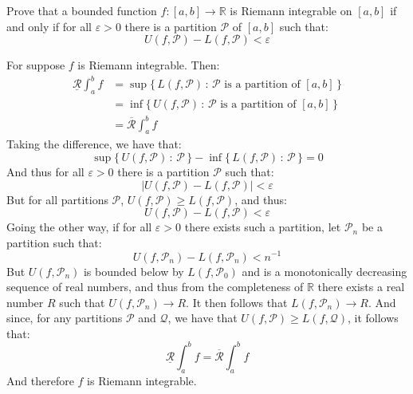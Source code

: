 \documentclass[crop=false,class=article]{standalone}                           %
\begin{document}
    \begin{problem}
        Prove that a bounded function $f:[a,b]\rightarrow\mathbb{R}$ is
        Riemann integrable on $[a,b]$ if and only if for all $\varepsilon>0$
        there is a partition $\mathcal{P}$ of $[a,b]$ such that:
        \begin{equation}
            U(f,\mathcal{P})-L(f,\mathcal{P})<\varepsilon
        \end{equation}
    \end{problem}
    \begin{solution}
        For suppose $f$ is Riemann integrable. Then:
        \begin{subequations}
            \begin{align}
                \underline{\mathcal{R}}\int_{a}^{b}f
                &=\sup\Big\{\,L(f,\mathcal{P})\,:\,
                    \mathcal{P}\textrm{ is a partition of }[a,b]\,\Big\}\\
                &=\inf\Big\{\,U(f,\mathcal{P})\,:\,
                    \mathcal{P}\textrm{ is a partition of }[a,b]\,\Big\}\\
                &=\overline{\mathcal{R}}\int_{a}^{b}f
            \end{align}
        \end{subequations}
        Taking the difference, we have that:
        \begin{equation}
            \sup\{\,U(f,\mathcal{P})\,:\,\mathcal{P}\,\}-
            \inf\{\,L(f,\mathcal{P})\,:\,\mathcal{P}\,\}=0
        \end{equation}
        And thus for all $\varepsilon>0$ there is a partition $\mathcal{P}$
        such that:
        \begin{equation}
            |U(f,\mathcal{P})-L(f,\mathcal{P})|<\varepsilon
        \end{equation}
        But for all partitions $\mathcal{P}$,
        $U(f,\mathcal{P})\geq{L}(f,\mathcal{P})$, and thus:
        \begin{equation}
            U(f,\mathcal{P})-L(f,\mathcal{P})<\varepsilon
        \end{equation}
        Going the other way, if for all $\varepsilon>0$ there exists such a
        partition, let $\mathcal{P}_{n}$ be a partition such that:
        \begin{equation}
            U(f,\mathcal{P}_{n})-L(f,\mathcal{P}_{n})<n^{\minus{1}}
        \end{equation}
        But $U(f,\mathcal{P}_{n})$ is bounded below by $L(f,\mathcal{P}_{0})$
        and is a monotonically decreasing sequence of real numbers, and thus
        from the completeness of $\mathbb{R}$ there exists a real number $R$
        such that $U(f,\mathcal{P}_{n})\rightarrow{R}$. It then follows that
        $L(f,\mathcal{P}_{n})\rightarrow{R}$. And since, for any partitions
        $\mathcal{P}$ and $\mathcal{Q}$, we have that
        $U(f,\mathcal{P})\geq{L}(f,\mathcal{Q})$, it follows that:
        \begin{equation}
            \underline{\mathcal{R}}\int_{a}^{b}f
            =\overline{\mathcal{R}}\int_{a}^{b}f
        \end{equation}
        And therefore $f$ is Riemann integrable.
    \end{solution}
\end{document}

